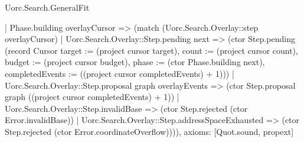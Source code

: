 \begin{lexlean}{Uorc.Search.GeneralFit}
\begin{semanticmodule}
{    | Phase.building overlayCursor => (match (Uorc.Search.Overlay::step overlayCursor)
      | Uorc.Search.Overlay::Step.pending next => (ctor Step.pending (record Cursor {target := (project cursor target), count := (project cursor count), budget := (project cursor budget), phase := (ctor Phase.building next), completedEvents := ((project cursor completedEvents) + 1)}))
      | Uorc.Search.Overlay::Step.proposal graph overlayEvents => (ctor Step.proposal graph ((project cursor completedEvents) + 1))
      | Uorc.Search.Overlay::Step.invalidBase => (ctor Step.rejected (ctor Error.invalidBase))
      | Uorc.Search.Overlay::Step.addressSpaceExhausted => (ctor Step.rejected (ctor Error.coordinateOverflow)))),
  axioms: [Quot.sound, propext]
}
\end{semanticmodule}
\end{lexlean}
